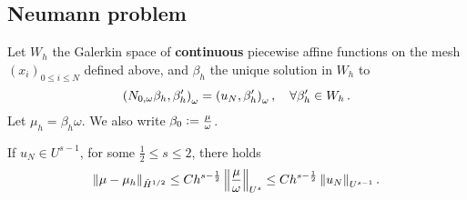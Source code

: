 \documentclass[a4paper]{article}
\begin{document}
\subsection{Neumann problem}


Let $W_h$ the Galerkin space of {\bf continuous} piecewise affine functions 
on the mesh $(x_i)_{0\leq i \leq N}$ defined above, and $\beta_h$ the unique solution in $W_h$ to
\begin{equation}
\label{NomegaBetaGalerk}
\left( N_{0,\omega} \beta_h,\beta_h'\right)_{\omega} = \left( u_N,\beta_h'\right)_{\omega}, \quad \forall \beta_h' \in W_h\,.
\end{equation}
Let $\mu_h = {\beta_h}{\omega}$. We also write $\beta_0 \mathrel{\mathop:}= \frac{\mu}{\omega}$. 
\begin{theorem}
	If $u_N \in U^{s-1}$, for some $\frac{1}{2} \leq s \leq 2$, there holds 
	\[\left\|\mu - \mu_h\right\|_{\tilde{H}^{1/2}} \leq Ch^{s - \frac{1}{2}}\left\|\frac{\mu}{\omega}\right\|_{U^s} \leq C h^{s - \frac{1}{2}}\left\|u_N\right\|_{U^{s-1}}.\]
	\label{theOrdreCVNeumann}
\end{theorem}
\end{document}
